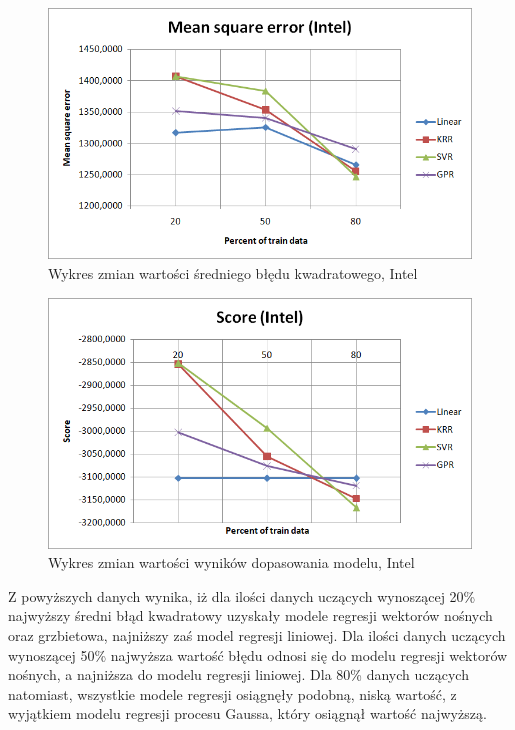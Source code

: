 \begin{figure}[ht]
\centering
\includegraphics[scale=0.6]{pictures/plots/intel_mean_square.png}
\caption{Wykres zmian wartości średniego błędu kwadratowego, Intel}
\label{fig:intel_mean_square}
\end{figure}

\newpage

\begin{figure}[ht]
\centering
\includegraphics[scale=0.6]{pictures/plots/intel_score.png}
\caption{Wykres zmian wartości wyników dopasowania modelu, Intel}
\label{fig:intel_score}
\end{figure}

Z powyższych danych wynika, iż dla ilości danych uczących wynoszącej 20\% najwyższy średni błąd kwadratowy uzyskały modele regresji wektorów nośnych oraz grzbietowa, najniższy zaś model regresji liniowej.
Dla ilości danych uczących wynoszącej 50\% najwyższa wartość błędu odnosi się do modelu regresji wektorów nośnych, a najniższa do modelu regresji liniowej.
Dla 80\% danych uczących natomiast, wszystkie modele regresji osiągnęły podobną, niską wartość, z wyjątkiem modelu regresji procesu Gaussa, który osiągnął wartość najwyższą.\\

